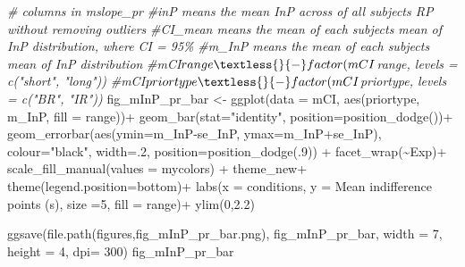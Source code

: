 \documentclass[
]{article}
\newenvironment{Shaded}{\begin{snugshade}}{\end{snugshade}}
\newcommand{\AttributeTok}[1]{\textcolor[rgb]{0.77,0.63,0.00}{#1}}
\newcommand{\CommentTok}[1]{\textcolor[rgb]{0.56,0.35,0.01}{\textit{#1}}}
\newcommand{\DecValTok}[1]{\textcolor[rgb]{0.00,0.00,0.81}{#1}}
\newcommand{\FloatTok}[1]{\textcolor[rgb]{0.00,0.00,0.81}{#1}}
\newcommand{\FunctionTok}[1]{\textcolor[rgb]{0.00,0.00,0.00}{#1}}
\newcommand{\NormalTok}[1]{#1}
\newcommand{\OtherTok}[1]{\textcolor[rgb]{0.56,0.35,0.01}{#1}}
\newcommand{\SpecialCharTok}[1]{\textcolor[rgb]{0.00,0.00,0.00}{#1}}
\newcommand{\StringTok}[1]{\textcolor[rgb]{0.31,0.60,0.02}{#1}}
\begin{document}
\begin{Shaded}
\begin{Highlighting}[]
\CommentTok{\# columns in mslope\_pr}
\CommentTok{\#inP means the mean InP across of all subjects\textquotesingle{} RP without removing outliers }
\CommentTok{\#CI\_mean means the mean of each subjects mean of InP distribution, where CI = 95\%}
\CommentTok{\#m\_InP means the mean of each subjects mean of InP distribution}
\CommentTok{\#mCI$range \textless{}{-} factor(mCI$range, levels = c("short", "long"))}
\CommentTok{\#mCI$priortype \textless{}{-} factor(mCI$priortype, levels = c("BR", "IR"))}
\NormalTok{fig\_mInP\_pr\_bar }\OtherTok{\textless{}{-}} \FunctionTok{ggplot}\NormalTok{(}\AttributeTok{data =}\NormalTok{ mCI, }\FunctionTok{aes}\NormalTok{(priortype, m\_InP, }\AttributeTok{fill =}\NormalTok{ range))}\SpecialCharTok{+}
  \FunctionTok{geom\_bar}\NormalTok{(}\AttributeTok{stat=}\StringTok{"identity"}\NormalTok{, }\AttributeTok{position=}\FunctionTok{position\_dodge}\NormalTok{())}\SpecialCharTok{+}
  \FunctionTok{geom\_errorbar}\NormalTok{(}\FunctionTok{aes}\NormalTok{(}\AttributeTok{ymin=}\NormalTok{m\_InP}\SpecialCharTok{{-}}\NormalTok{se\_InP, }\AttributeTok{ymax=}\NormalTok{m\_InP}\SpecialCharTok{+}\NormalTok{se\_InP), }\AttributeTok{colour=}\StringTok{"black"}\NormalTok{, }\AttributeTok{width=}\NormalTok{.}\DecValTok{2}\NormalTok{, }\AttributeTok{position=}\FunctionTok{position\_dodge}\NormalTok{(.}\DecValTok{9}\NormalTok{)) }\SpecialCharTok{+} 
  \FunctionTok{facet\_wrap}\NormalTok{(}\SpecialCharTok{\textasciitilde{}}\NormalTok{Exp)}\SpecialCharTok{+}
  \FunctionTok{scale\_fill\_manual}\NormalTok{(}\AttributeTok{values =}\NormalTok{ mycolors) }\SpecialCharTok{+}
\NormalTok{  theme\_new}\SpecialCharTok{+} \FunctionTok{theme}\NormalTok{(}\AttributeTok{legend.position=}\StringTok{\textquotesingle{}bottom\textquotesingle{}}\NormalTok{)}\SpecialCharTok{+}
  \FunctionTok{labs}\NormalTok{(}\AttributeTok{x =} \StringTok{\textquotesingle{}conditions\textquotesingle{}}\NormalTok{, }\AttributeTok{y =} \StringTok{\textquotesingle{}Mean indifference points (s)\textquotesingle{}}\NormalTok{, }\AttributeTok{size =}\DecValTok{5}\NormalTok{,  }\AttributeTok{fill =} \StringTok{\textquotesingle{}range\textquotesingle{}}\NormalTok{)}\SpecialCharTok{+}
  \FunctionTok{ylim}\NormalTok{(}\DecValTok{0}\NormalTok{,}\FloatTok{2.2}\NormalTok{)}

\FunctionTok{ggsave}\NormalTok{(}\FunctionTok{file.path}\NormalTok{(}\StringTok{\textquotesingle{}figures\textquotesingle{}}\NormalTok{,}\StringTok{\textquotesingle{}fig\_mInP\_pr\_bar.png\textquotesingle{}}\NormalTok{), fig\_mInP\_pr\_bar, }\AttributeTok{width =} \DecValTok{7}\NormalTok{, }\AttributeTok{height =} \DecValTok{4}\NormalTok{, }\AttributeTok{dpi=} \DecValTok{300}\NormalTok{)}
\NormalTok{fig\_mInP\_pr\_bar}
\end{Highlighting}
\end{Shaded}
\end{document}
